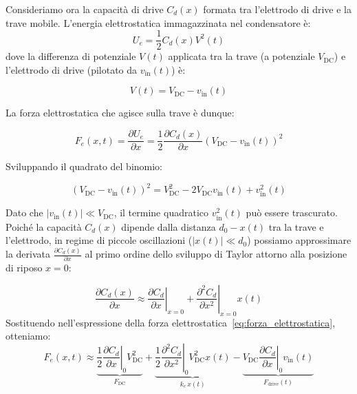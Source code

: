 \documentclass[11pt,a4paper]{article}
\begin{document}
\noindent Consideriamo ora la capacità di drive $C_d(x)$ formata tra l'elettrodo di drive e la trave mobile. 
\noindent L'energia elettrostatica immagazzinata nel condensatore è:
\begin{equation}
    U_e = \frac{1}{2} C_d(x) V^2(t)
\end{equation}
dove la differenza di potenziale $V(t)$ applicata tra la trave (a potenziale $V_{\text{DC}}$) e l'elettrodo di drive (pilotato da $v_{\text{in}}(t)$) è:

\begin{equation}
    V(t) = V_{\text{DC}} - v_{\text{in}}(t)
\end{equation}

\noindent La forza elettrostatica che agisce sulla trave è dunque:

\begin{equation}
    \label{eq:forza_elettrostatica}
    F_e(x, t) = \frac{\partial U_e}{\partial x} = \frac{1}{2} \frac{\partial C_d(x)}{\partial x} \left( V_{\text{DC}} - v_{\text{in}}(t) \right)^2
\end{equation}

\noindent Sviluppando il quadrato del binomio:

\begin{equation}
    \left( V_{\text{DC}} - v_{\text{in}}(t) \right)^2 = V_{\text{DC}}^2 - 2 V_{\text{DC}} v_{\text{in}}(t) + v_{\text{in}}^2(t)
\end{equation}

\noindent Dato che $|v_{\text{in}}(t)| \ll V_{\text{DC}}$, il termine quadratico $v_{\text{in}}^2(t)$ può essere trascurato. Poiché la capacità $C_d(x)$ dipende dalla distanza $d_0 - x(t)$ tra la trave e l'elettrodo, in regime di piccole oscillazioni ($|x(t)| \ll d_0$) possiamo approssimare la derivata $\frac{\partial C_d(x)}{\partial x}$ al primo ordine dello sviluppo di Taylor attorno alla posizione di riposo $x = 0$:

\begin{equation}
    \frac{\partial C_d(x)}{\partial x} \approx \left. \frac{\partial C_d}{\partial x} \right|_{x=0} + \left. \frac{\partial^2 C_d}{\partial x^2} \right|_{x=0} x(t)
\end{equation}
\noindent Sostituendo nell'espressione della forza elettrostatica~\eqref{eq:forza_elettrostatica}, otteniamo:
\begin{equation}
    F_e(x, t) \approx \underbrace{\frac{1}{2} \left. \frac{\partial C_d}{\partial x} \right|_0 V_{\text{DC}}^2}_{F_{\text{DC}}} + \underbrace{\frac{1}{2} \left. \frac{\partial^2 C_d}{\partial x^2} \right|_0 V_{\text{DC}}^2 x(t)}_{k_e \, x(t)} - \underbrace{V_{\text{DC}} \left. \frac{\partial C_d}{\partial x} \right|_0 v_{\text{in}}(t)}_{F_{\text{drive}}(t)}
\end{equation}
\end{document}
